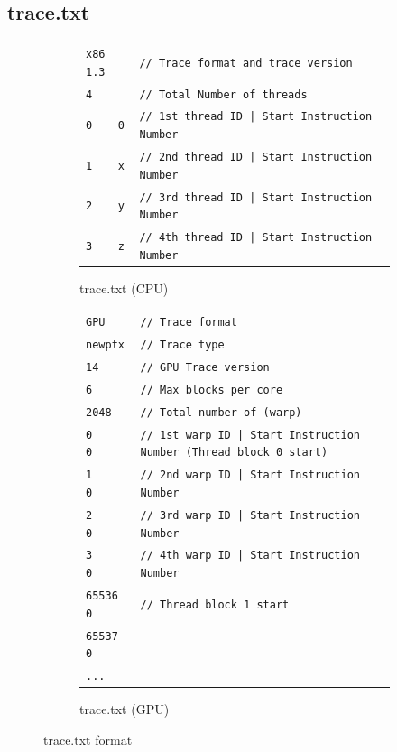 \subsection{trace.txt}


\begin{figure}[htb]
    \begin{subfigure}{1\textwidth}
        \centering
        \begin{tabular}{l l}
             \Verb+x86 1.3+ & \Verb+// Trace format and trace version+ \\
             \Verb+4+       & \Verb+// Total Number of threads+ \\
             \Verb+0    0+     & \Verb+// 1st thread ID | Start Instruction Number+ \\
             \Verb+1    x+     & \Verb+// 2nd thread ID | Start Instruction Number+ \\
             \Verb+2    y+     & \Verb+// 3rd thread ID | Start Instruction Number+ \\
             \Verb+3    z+     & \Verb+// 4th thread ID | Start Instruction Number+
        \end{tabular}
        \caption{trace.txt (CPU)}
        \label{fig:trace_format_first}
    \end{subfigure}
    \begin{subfigure}{1\textwidth}
        \centering
        \begin{tabular}{l l}
             \Verb+GPU+      & \Verb+// Trace format+ \\
             \Verb+newptx+   & \Verb+// Trace type+ \\
             \Verb+14+       & \Verb+// GPU Trace version+ \\
             \Verb+6+        & \Verb+// Max blocks per core+ \\
             \Verb+2048+     & \Verb+// Total number of (warp)+ \\
             \Verb+0     0+  & \Verb+// 1st warp ID | Start Instruction Number (Thread block 0 start)+ \\
             \Verb+1     0+  & \Verb+// 2nd warp ID | Start Instruction Number+ \\
             \Verb+2     0+  & \Verb+// 3rd warp ID | Start Instruction Number+ \\
             \Verb+3     0+  & \Verb+// 4th warp ID | Start Instruction Number+ \\
             \Verb+65536 0+  & \Verb+// Thread block 1 start+ \\
             \Verb+65537 0+  & \Verb++ \\
             \Verb+...+      & \Verb++
        \end{tabular}
        \caption{trace.txt (GPU)}
        \label{fig:trace_format_second}
    \end{subfigure}
    \caption{trace.txt format} 
    \label{fig:trace_format}
\end{figure}

